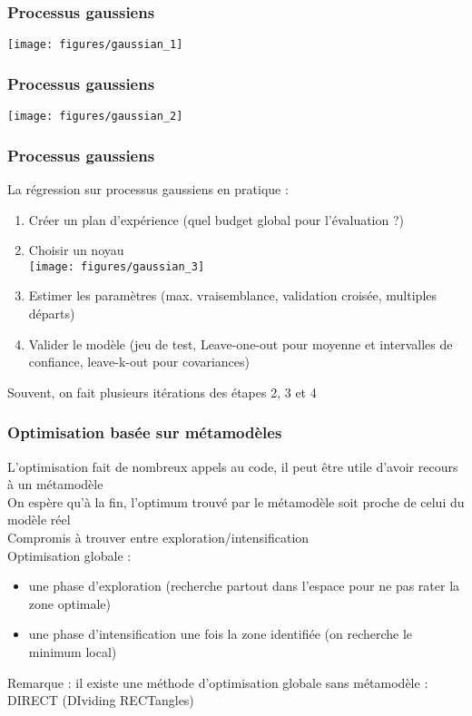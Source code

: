 \documentclass[10pt]{beamer}
\begin{document}
\begin{frame}
\frametitle{Processus gaussiens}

\centering
\texttt{[image: figures/gaussian\_1]}

\end{frame}

\begin{frame}
\frametitle{Processus gaussiens}

\centering
\texttt{[image: figures/gaussian\_2]}

\end{frame}

\begin{frame}
\frametitle{Processus gaussiens}

La régression sur processus gaussiens en pratique :
\begin{enumerate}
	\item Créer un plan d'expérience (quel budget global pour l'évaluation ?)
	\item Choisir un noyau\\
	\texttt{[image: figures/gaussian\_3]}
	\item Estimer les paramètres (max. vraisemblance, validation croisée, multiples départs)
	\item Valider le modèle (jeu de test, Leave-one-out pour moyenne et intervalles de confiance, leave-k-out pour covariances)
\end{enumerate}
Souvent, on fait plusieurs itérations des étapes 2, 3 et 4

\end{frame}

\begin{frame}
\frametitle{Optimisation basée sur métamodèles}

L'optimisation fait de nombreux appels au code, il peut être utile d'avoir recours à un métamodèle\\
\bigskip
On espère qu'à la fin, l'optimum trouvé par le métamodèle soit proche de celui du modèle réel\\
\bigskip
Compromis à trouver entre exploration/intensification\\
\bigskip
Optimisation globale :
\begin{itemize}
	\item une phase d'exploration (recherche partout dans l'espace pour ne pas rater la zone optimale)
	\item une phase d'intensification une fois la zone identifiée (on recherche le minimum local)
\end{itemize}
Remarque : il existe une méthode d'optimisation globale sans métamodèle : DIRECT (DIviding RECTangles)

\end{frame}
\end{document}
